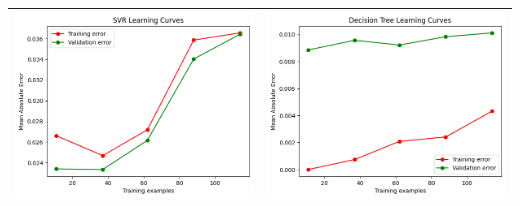 \begin{table}[H]
    \centering
    \footnotesize
    \setlength\tabcolsep{0pt}
    \begin{tabularx}{\textwidth}{|X|X|}
        \hline
        \includegraphics[width=\linewidth, trim=0 0 0 0]{images/SVR_lc50_ridotto.png} &
        \includegraphics[width=\linewidth, trim=0 0 0 0]{images/DecisionTree_lc50_ridotto.png} \\
        \hline

\end{tabularx}
\end{table}
